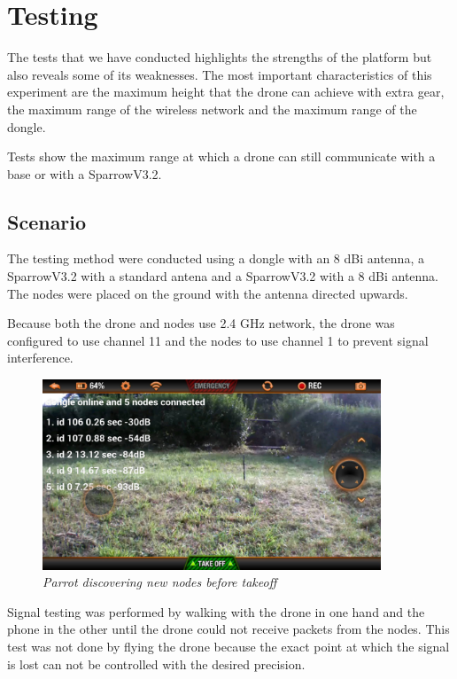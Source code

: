 \normalfont\normalsize
\chapter{Testing}

The tests that we have conducted highlights the strengths of the platform but also reveals some of its weaknesses.
The most important characteristics of this experiment are the maximum height that the drone  can achieve with extra gear, the maximum range of the wireless network and the maximum range of the dongle.

Tests show the maximum range at which a drone can still communicate with a base or with a SparrowV3.2.


\section{Scenario}
 
The testing method were conducted using a dongle with an 8 dBi antenna, a SparrowV3.2  with a standard antena and a SparrowV3.2 with a 8 dBi antenna. The nodes were placed on the ground with the antenna directed upwards.

Because both the drone and nodes use 2.4 GHz network, the drone was configured to use channel 11 and the nodes to use channel 1 to prevent signal interference.

\begin{figure}[ht]
\begin{center}
\includegraphics[width=0.9\textwidth]{img/parrot_test.png}
\end{center}
\caption{\small \itshape{Parrot discovering new nodes before takeoff}}
\end{figure}

Signal testing was performed by walking with the drone in one hand and the phone in the other until the drone could not receive packets from the nodes. This test was not done by flying the drone because the exact point at which the signal is lost can not be controlled with the desired precision.


